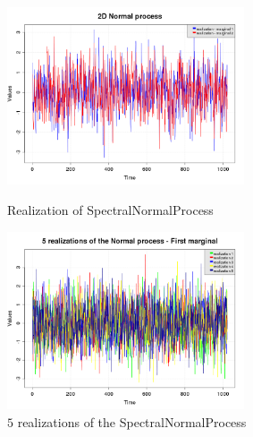 \begin{figure}[H]
  \begin{minipage}{9cm}
    \begin{center}
      \includegraphics[width=7cm]{spectralNormal2D_realization.png}
      \caption{Realization of SpectralNormalProcess}
      \label{spectralNormalProcess_Realization}
    \end{center}
  \end{minipage}
  \hfill
  \begin{minipage}{9cm}
    \begin{center}
      \includegraphics[width=7cm]{spectralNormal2D_realizations.png}
      \caption{$5$ realizations of the SpectralNormalProcess}
      \label{spectralNormalProcess_Realizations}
    \end{center}
  \end{minipage}
\end{figure}
